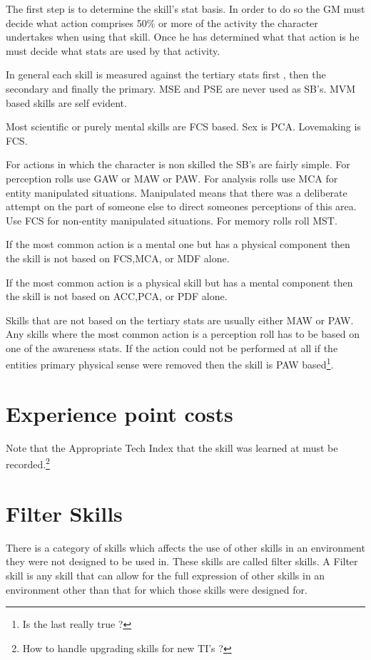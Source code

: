 The first step is to determine the skill's stat basis. In order to do
so the GM must decide what action comprises 50\% or more of the activity
the character undertakes when using that skill. Once he has determined
what that action is he must decide what stats are used by that activity.

In general each skill is measured against the tertiary stats first , then the
secondary and finally the primary. MSE and PSE are never used as SB's.
MVM based skills are self evident.

Most scientific or purely mental skills are FCS based.
Sex is PCA. Lovemaking is FCS.

For actions in which the character is non skilled the SB's are fairly
simple. For perception rolls use GAW or MAW or PAW. For analysis rolls
use MCA for entity manipulated situations. Manipulated means that there
was a deliberate attempt on the part of someone else to direct someones
perceptions of this area. Use FCS for non-entity manipulated
situations. For memory rolls roll MST.

If the most common action is a mental one but has a physical component then
the skill is not based on FCS,MCA, or MDF alone.

If the most common action is a physical skill but has a mental component then the
skill is not based on ACC,PCA, or PDF alone.

Skills that are not based on the tertiary stats are usually either MAW
or PAW. Any skills where the most common action is a perception roll has
to be based on one of the awareness stats. If the action could not be
performed at all if the entities primary physical sense were removed
then the skill is PAW based\footnote{Is the last really true ?}.

\section{Experience point costs}

Note that the Appropriate Tech Index that the skill was learned at
must be recorded.\footnote{ How to handle upgrading skills for new TI's ?}

\section{Filter Skills}

There is a category of skills which affects the use of other skills
in an environment they were not designed to be used in. These skills
are called filter skills. A Filter skill is any skill that can allow
for the full expression of other skills in an environment other than
that for which those skills were designed for.

